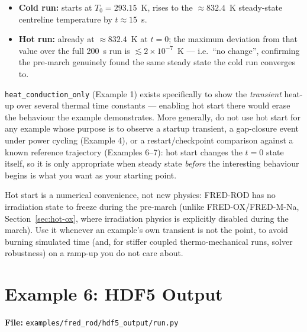 \documentclass[11pt,a4paper]{article}
\begin{document}
\begin{itemize}
  \item \textbf{Cold run:} starts at $T_0 = 293.15$~K, rises to the
        $\approx 832.4$~K steady-state centreline temperature by
        $t \approx 15$~s.
  \item \textbf{Hot run:} already at $\approx 832.4$~K at $t=0$; the maximum
        deviation from that value over the full 200~s run is
        $\lesssim 2\times 10^{-7}$~K --- i.e.\ ``no change'', confirming the
        pre-march genuinely found the same steady state the cold run
        converges to.
\end{itemize}

\begin{warningbox}
  \texttt{heat\_conduction\_only} (Example 1) exists specifically to show the
  \emph{transient} heat-up over several thermal time constants --- enabling
  hot start there would erase the behaviour the example demonstrates.  More
  generally, do not use hot start for any example whose purpose is to
  observe a startup transient, a gap-closure event under power cycling
  (Example 4), or a restart/checkpoint comparison against a known reference
  trajectory (Examples 6--7): hot start changes the $t=0$ state itself, so it
  is only appropriate when steady state \emph{before} the interesting
  behaviour begins is what you want as your starting point.
\end{warningbox}

\begin{infobox}
  Hot start is a numerical convenience, not new physics: FRED-ROD has no
  irradiation state to freeze during the pre-march (unlike FRED-OX/FRED-M-Na,
  Section~\ref{sec:hot-ox}, where irradiation physics is explicitly disabled
  during the march).  Use it whenever an example's own transient is not the
  point, to avoid burning simulated time (and, for stiffer coupled
  thermo-mechanical runs, solver robustness) on a ramp-up you do not care
  about.
\end{infobox}

\section{Example 6: HDF5 Output}
\label{sec:hdf5}

\textbf{File:} \texttt{examples/fred\_rod/hdf5\_output/run.py}
\end{document}
